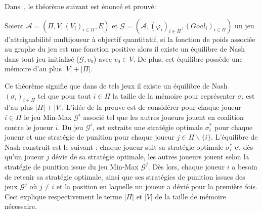 



 Dans~\cite{DBLP:conf/lfcs/BrihayePS13}, le théorème suivant est énoncé et prouvé:

\begin{thm}
	Soient $\mathcal{A} = (\Pi, V, (V_{i})_{i \in \Pi}, E)$ et $\mathcal{G} = (\mathcal{A},(\varphi _{i})_{i \in \Pi}, (Goal_{i})_{i \in \Pi})$ un jeu d'atteignabilité multijoueur à objectif quantitatif, si la fonction de poids associée au graphe du jeu est une fonction positive alors il existe un équilibre de Nash dans tout jeu initialisé ($\mathcal{G},v_{0}$) avec $v_{0}\in V$. De plus, cet équilibre possède une mémoire d'au plus $|V| + |\Pi|$.
\end{thm}

Ce théorème signifie que dans de tels jeux il existe un équilibre de Nash $(\sigma_i)_{i\in \Pi}$ tel que pour tout $i \in \Pi$ la taille de la mémoire pour représenter $\sigma_i$ est d'au plus $|\Pi| + |V|$. L'idée de la preuve est de considérer  pour chaque joueur $i \in \Pi$ le jeu Min-Max $\mathcal{G}^i$ associé tel que les autres joueurs jouent en coalition contre le joueur $i$. Du jeu $\mathcal{G}^i$, est extraite une stratégie optimale $\sigma_i^*$ pour chaque joueur et une stratégie de punition pour chaque joueur $j \in \Pi \backslash \{i\}$. L'équilibre de Nash construit est le suivant : chaque joueur suit sa stratégie optimale $\sigma_i^*$ et dès qu'un joueur $j$ dévie de sa stratégie optimale, les autres joueurs jouent selon la stratégie de punition issue du jeu Min-Max $\mathcal{G}^j$. Dès lors, chaque joueur $i$ a besoin de retenir sa stratégie optimale, ainsi que ses stratégies de punition issues des jeux $\mathcal{G}^j$ où $j \neq i$ et la position en laquelle un joueur a dévié pour la première fois. Ceci explique respectivement le terme $|\Pi|$ et $|V|$ de la taille de mémoire nécessaire.

